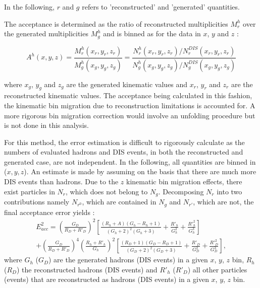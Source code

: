 In the following, $r$ and $g$ refers to 'reconstructed' and 'generated' quantities.

The acceptance is determined as the ratio of reconstructed multiplicities $M^h_r$ over the generated multiplicities $M^h_g$ and is binned as for the data in $x$, $y$ and $z$ :

\begin{equation}
  A^h(x,y,z) = \frac{M^h_r(x_r,y_r,z_r)}{M^h_g(x_g,y_g,z_g)}=\frac{N^h_r(x_r,y_r,z_r)/N^{DIS}_r(x_r,y_r,z_r)}{N^h_g(x_g,y_g,z_g)/N^{DIS}_g(x_g,y_g,z_g)}
\end{equation}

where $x_g$, $y_g$ and $z_g$ are the generated kinematic values and $x_r$, $y_r$ and $z_r$ are the reconstructed kinematic values. The acceptance being calculated in this fashion, the kinematic bin migration due to reconstruction limitations is accounted for. A more rigorous bin migration correction would involve an unfolding procedure but is not done in this analysis.

For this method, the error estimation is difficult to rigorously calculate as the numbers of evaluated hadrons and DIS events, in both the reconstructed and generated case, are not independent. In the following, all quantities are binned in ($x,y,z$). An estimate is made by assuming on the basis that there are much more DIS events than hadrons. Due to the $z$ kinematic bin migration effects, there exist particles in $N_r$, which does not belong to $N_g$. Decomposing $N_r$ into two contributions namely $N_{r^0}$, which are contained in $N_g$ and $N_{r'}$, which are not, the final acceptance error yields :
%
\begin{equation}
  \begin{split}
    E^2_{acc} = \left (\frac{G_D}{R_D+R'_{D}}\right )^2\left [\frac{(R_h+A)(G_h-R_h+1)}{(G_h+2)^2(G_h+3)}+\frac{R'_{h}}{G^2_h}+\frac{R'^2_h}{G^3_h}\right ] \\
                + \left (\frac{G_D}{R_D+R'_{D}}\right )^4\left (\frac{R_h+R'_h}{G_h}\right )^2\left [\frac{(R_D+1)(G_D-R_D+1)}{(G_D+2)^2(G_D+3)}+\frac{R'_D}{G^2_D}+\frac{R'^2_D}{G^3_D}\right ],
  \end{split}
\end{equation}
%
where $G_h$ ($G_D$) are the generated hadrons (DIS events) in a given $x$, $y$, $z$ bin, $R_h$ ($R_D$) the reconstructed hadrons (DIS events) and $R'_h$ ($R'_D$) all other particles (events) that are reconstructed as hadrons (DIS events) in a given $x$, $y$, $z$ bin.

